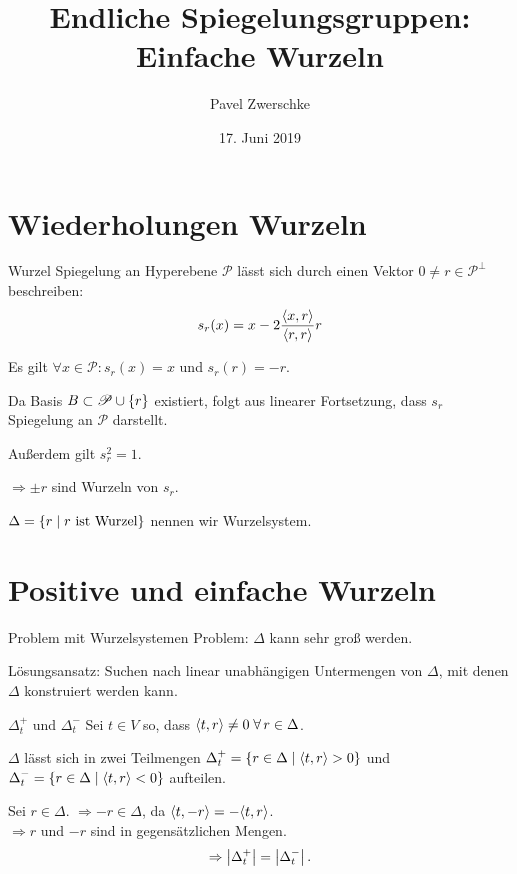 \documentclass[18pt,handout]{beamer}
\title[Einfache Wurzeln]{Endliche Spiegelungsgruppen:\\
Einfache Wurzeln}
\author{Pavel Zwerschke}
\date{17. Juni 2019}
\begin{document}
\begin{frame}
    \maketitle
\end{frame}

\begin{frame}
    \tableofcontents
\end{frame}

\section{Wiederholungen Wurzeln}

\begin{frame}{Wurzel}
    Spiegelung an Hyperebene \( \mathscr{P} \) 
    lässt sich durch einen Vektor
    \( 0 \neq r \in \mathscr{P}^{\bot} \)
    beschreiben:
    \[ s_r(x) = x 
    - 2\frac{\langle x, r \rangle}{\langle r, r \rangle} r \]
    \pause
    
    Es gilt \( \forall x \in \mathscr{P}: s_r(x) = x \) 
    und \( s_r(r) = -r \). \pause

    Da Basis \( B \subset \mathscr{P} \cup \{r\} \) 
    existiert, folgt aus linearer Fortsetzung, dass 
    \( s_r \) Spiegelung an \( \mathscr{P} \) darstellt.

    \pause
    Außerdem gilt \( s_r^2 = 1 \).

    \( \Rightarrow \pm r \) sind Wurzeln von \( s_r \).

    \( \Delta = \{ r \;\vert\; r \text{ ist Wurzel} \} \) 
    nennen wir Wurzelsystem.
\end{frame}
\section{Positive und einfache Wurzeln}
\begin{frame}{Problem mit Wurzelsystemen}
    Problem: \( \Delta \) kann sehr groß werden. \pause

    Lösungsansatz: Suchen nach linear unabhängigen 
    Untermengen von \( \Delta \), mit denen \( \Delta \)
    konstruiert werden kann.
\end{frame}

\begin{frame}{\( \Delta_t^+ \) und \( \Delta_t^- \)}
    Sei \( t \in V \) so, dass \( \scalarprod{t}{r} \neq 0 
    \; \forall r \in \Delta \).\pause

    \( \Delta \) lässt sich in zwei Teilmengen 
    \( \Delta_t^+ = 
    \{r \in \Delta \;\vert \; \langle t, r \rangle > 0\} \) 
    und \( \Delta_t^- = 
    \{r \in \Delta \;\vert \; \langle t, r \rangle < 0\} \) 
    aufteilen. \pause

    Sei \( r \in \Delta \). \( \Rightarrow -r \in \Delta \), 
    da \( \langle t, -r \rangle = -\langle t, r \rangle \).\\
    \( \Rightarrow r \) und \( -r \) sind in 
    gegensätzlichen Mengen. \pause
    \[ \Rightarrow \left|\Delta_t^+\right| = \left|\Delta_t^-\right|. \]
\end{frame}
\end{document}
